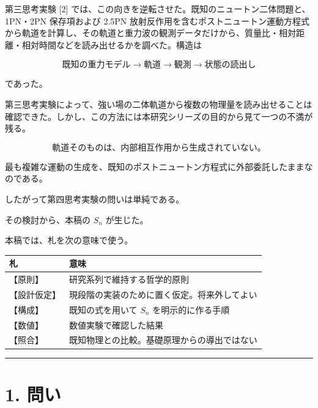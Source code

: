 \documentclass[
  a4paper,
]{ltjsarticle}
\newcounter{none} %
\begin{document}
第三思考実験 {[}2{]}
では、この向きを逆転させた。既知のニュートン二体問題と、1PN・2PN
保存項および 2.5PN
放射反作用を含むポストニュートン運動方程式から軌道を計算し、その軌道と重力波の観測データだけから、質量比・相対距離・相対時間などを読み出せるかを調べた。構造は

\[
\boxed{
\text{既知の重力モデル}
\rightarrow
\text{軌道}
\rightarrow
\text{観測}
\rightarrow
\text{状態の読出し}
}
\]

であった。

第三思考実験によって、強い場の二体軌道から複数の物理量を読み出せることは確認できた。しかし、この方法には本研究シリーズの目的から見て一つの不満が残る。

\[
\boxed{
\text{軌道そのものは、内部相互作用から生成されていない。}
}
\]

最も複雑な運動の生成を、既知のポストニュートン方程式に外部委託したままなのである。

したがって第四思考実験の問いは単純である。

\begin{center}
\end{center}

その検討から、本稿の \(S_n\) が生じた。

本稿では、札を次の意味で使う。

{\def\LTcaptype{none} %
\begin{longtable}[]{@{}ll@{}}
\toprule\noalign{}
札 & 意味 \\
\midrule\noalign{}
\endhead
\bottomrule\noalign{}
\endlastfoot
【原則】 & 研究系列で維持する哲学的原則 \\
【設計仮定】 & 現段階の実装のために置く仮定。将来外してよい \\
【構成】 & 既知の式を用いて \(S_n\) を明示的に作る手順 \\
【数値】 & 数値実験で確認した結果 \\
【照合】 & 既知物理との比較。基礎原理からの導出ではない \\
\end{longtable}
}

\begin{center}\rule{0.5\linewidth}{0.5pt}\end{center}

\section{1. 問い}\label{ux554fux3044}
\end{document}
